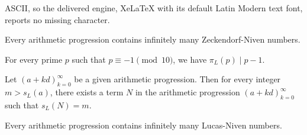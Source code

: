 \documentclass[10pt,a4paper]{amsart}
\begin{document}
ASCII, so the delivered engine, XeLaTeX with its default Latin Modern text font, reports no missing character.
\begin{theorem}\label{thm:infinZN}
Every arithmetic progression contains infinitely many Zeckendorf-Niven numbers.
\end{theorem}

\begin{lemma}\label{lem:piL}
For every prime $p$ such that $p\equiv-1\pmod{10}$, we have $\pi_L(p)\mid p-1$.
\end{lemma}

\begin{lemma}\label{lem:prescribedsL}
Let $(a+kd)_{k=0}^\infty$ be a given arithmetic progression. Then for every integer $m>s_L(a)$, there exists a term $N$ in the arithmetic progression $(a+kd)_{k=0}^\infty$ such that $s_L(N)=m$.
\end{lemma}

\begin{theorem}\label{thm:infinLN}
Every arithmetic progression contains infinitely many Lucas-Niven numbers.
\end{theorem}
\end{document}
